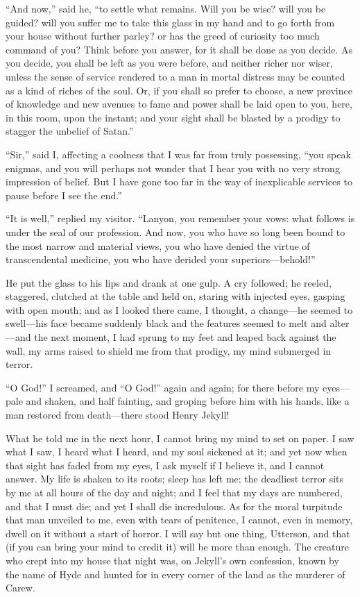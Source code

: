 \documentclass[12pt,openright]{book}
\begin{document}
“And now,” said he, “to settle what remains. Will you be wise? will you be guided? will you suffer me to take this glass in my hand and to go forth from your house without further parley? or has the greed of curiosity too much command of you? Think before you answer, for it shall be done as you decide. As you decide, you shall be left as you were before, and neither richer nor wiser, unless the sense of service rendered to a man in mortal distress may be counted as a kind of riches of the soul. Or, if you shall so prefer to choose, a new province of knowledge and new avenues to fame and power shall be laid open to you, here, in this room, upon the instant; and your sight shall be blasted by a prodigy to stagger the unbelief of Satan.”

“Sir,” said I, affecting a coolness that I was far from truly possessing, “you speak enigmas, and you will perhaps not wonder that I hear you with no very strong impression of belief. But I have gone too far in the way of inexplicable services to pause before I see the end.”

“It is well,” replied my visitor. “Lanyon, you remember your vows: what follows is under the seal of our profession. And now, you who have so long been bound to the most narrow and material views, you who have denied the virtue of transcendental medicine, you who have derided your superiors—behold!”

He put the glass to his lips and drank at one gulp. A cry followed; he reeled, staggered, clutched at the table and held on, staring with injected eyes, gasping with open mouth; and as I looked there came, I thought, a change—he seemed to swell—his face became suddenly black and the features seemed to melt and alter—and the next moment, I had sprung to my feet and leaped back against the wall, my arms raised to shield me from that prodigy, my mind submerged in terror.

“O God!” I screamed, and “O God!” again and again; for there before my eyes—pale and shaken, and half fainting, and groping before him with his hands, like a man restored from death—there stood Henry Jekyll!

What he told me in the next hour, I cannot bring my mind to set on paper. I saw what I saw, I heard what I heard, and my soul sickened at it; and yet now when that sight has faded from my eyes, I ask myself if I believe it, and I cannot answer. My life is shaken to its roots; sleep has left me; the deadliest terror sits by me at all hours of the day and night; and I feel that my days are numbered, and that I must die; and yet I shall die incredulous. As for the moral turpitude that man unveiled to me, even with tears of penitence, I cannot, even in memory, dwell on it without a start of horror. I will say but one thing, Utterson, and that (if you can bring your mind to credit it) will be more than enough. The creature who crept into my house that night was, on Jekyll’s own confession, known by the name of Hyde and hunted for in every corner of the land as the murderer of Carew.
\end{document}
